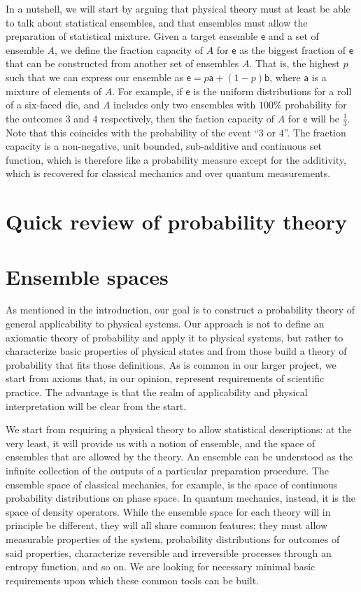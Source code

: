 \documentclass[10pt,twocolumn, nofootinbib]{revtex4-2}
\newcommand{\ens}[1][e] {\mathsf{#1}} %
\begin{document}
In a nutshell, we will start by arguing that physical theory must at least be able to talk about statistical ensembles, and that ensembles must allow the preparation of statistical mixture. Given a target ensemble $\ens$ and a set of ensemble $A$, we define the fraction capacity of $A$ for $\ens$ as the biggest fraction of $\ens$ that can be constructed from another set of ensembles $A$. That is, the highest $p$ such that we can express our ensemble as $\ens = p \ens[a] + (1-p) \ens[b]$, where $\ens[a]$ is a mixture of elements of $A$. For example, if $\ens$ is the uniform distributions for a roll of a six-faced die, and $A$ includes only two ensembles with $100\%$ probability for the outcomes $3$ and $4$ respectively, then the faction capacity of $A$ for $\ens$ will be $\frac{1}{3}$. Note that this coincides with the probability of the event ``$3$ or $4$''. The fraction capacity is a non-negative, unit bounded, sub-additive and continuous set function, which is therefore like a probability measure except for the additivity, which is recovered for classical mechanics and over quantum measurements.

\section{Quick review of probability theory}


\section{Ensemble spaces}

As mentioned in the introduction, our goal is to construct a probability theory of general applicability to physical systems. Our approach is not to define an axiomatic theory of probability and apply it to physical systems, but rather to characterize basic properties of physical states and from those build a theory of probability that fits those definitions. As is common in our larger project, we start from axioms that, in our opinion, represent requirements of scientific practice. The advantage is that the realm of applicability and physical interpretation will be clear from the start. 

We start from requiring a physical theory to allow statistical descriptions: at the very least, it will provide us with a notion of ensemble, and the space of ensembles that are allowed by the theory. An ensemble can be understood as the infinite collection of the outputs of a particular preparation procedure. The ensemble space of classical mechanics, for example, is the space of continuous probability distributions on phase space. In quantum mechanics, instead, it is the space of density operators. While the ensemble space for each theory will in principle be different, they will all share common features: they must allow measurable properties of the system, probability distributions for outcomes of said properties, characterize reversible and irreversible processes through an entropy function, and so on. We are looking for necessary minimal basic requirements upon which these common tools can be built.
\end{document}
